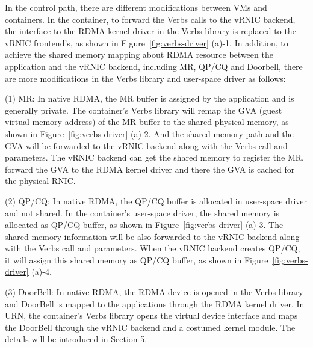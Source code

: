 In the control path, there are different modifications between VMs and containers. In the container, to forward the Verbs calls to the vRNIC backend, the interface to the RDMA kernel driver in the Verbs library is replaced to the vRNIC frontend's, as shown in Figure~\ref{fig:verbs-driver} (a)-1. In addition, to achieve the shared memory mapping about RDMA resource between the application and the vRNIC backend, including MR, QP/CQ and Doorbell, there are more modifications in the Verbs library and user-space driver as follows:

(1) MR: In native RDMA, the MR buffer is assigned by the application and is generally private. The container's Verbs library will remap the GVA (guest virtual memory address) of the MR buffer to the shared physical memory, as shown in Figure~\ref{fig:verbs-driver} (a)-2. And the shared memory path and the GVA will be forwarded to the vRNIC backend along with the Verbs call and parameters. The vRNIC backend can get the shared memory to register the MR, forward the GVA to the RDMA kernel driver and there the GVA is cached for the physical RNIC.

(2) QP/CQ: In native RDMA, the QP/CQ buffer is allocated in user-space driver and not shared. In the container's user-space driver, the shared memory is allocated as QP/CQ buffer, as shown in Figure~\ref{fig:verbs-driver} (a)-3. The shared memory information will be also forwarded to the vRNIC backend along with the Verbs call and parameters. When the vRNIC backend creates QP/CQ, it will assign this shared memory as QP/CQ buffer, as shown in Figure~\ref{fig:verbs-driver} (a)-4.

(3) DoorBell: In native RDMA, the RDMA device is opened in the Verbs library and DoorBell is mapped to the applications through the RDMA kernel driver. In URN, the container's Verbs library opens the virtual device interface and maps the DoorBell through the vRNIC backend and a costumed kernel module. The details will be introduced in Section 5.

